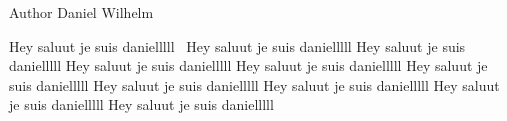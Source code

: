 \begin{DoxyAuthor}{Author}
Daniel Wilhelm
\end{DoxyAuthor}
Hey saluut je suis danielllll~\newline
Hey saluut je suis danielllll Hey saluut je suis danielllll Hey saluut je suis danielllll Hey saluut je suis danielllll Hey saluut je suis danielllll Hey saluut je suis danielllll Hey saluut je suis danielllll Hey saluut je suis danielllll Hey saluut je suis danielllll

   